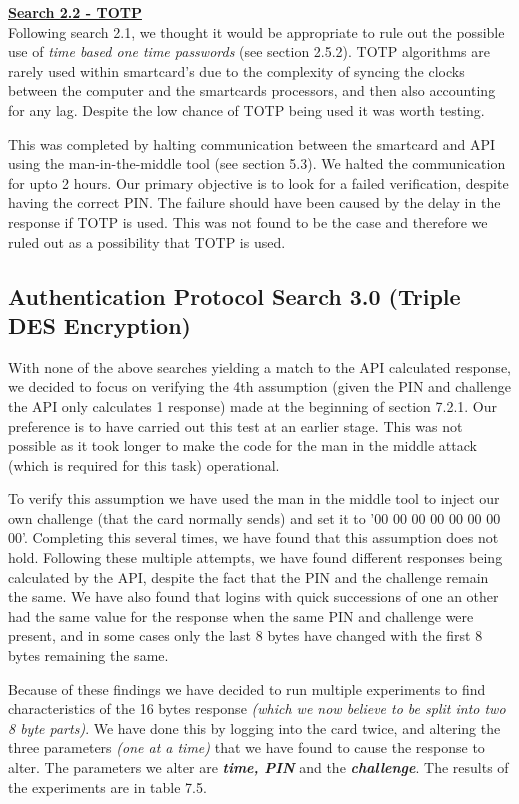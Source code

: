 \documentclass[bsc,frontabs,twoside,singlespacing,parskip,deptreport]{infthesis}     %
\begin{document}
\textbf{\underline{Search 2.2 - TOTP}}\\
Following search 2.1, we thought it would be appropriate to rule out the possible use of \textit{time based one time passwords} (see section 2.5.2). TOTP algorithms are rarely used within smartcard's due to the complexity of syncing the clocks between the computer and the smartcards processors, and then also accounting for any lag. Despite the low chance of TOTP being used it was worth testing.

This was completed by halting communication between the smartcard and API using the man-in-the-middle tool (see section 5.3). We halted the communication for upto 2 hours. Our primary objective is to look for a failed verification, despite having the correct PIN. The failure should have been caused by the delay in the response if TOTP is used. This was not found to be the case and therefore we ruled out as a possibility that TOTP is used.

\subsection{Authentication Protocol Search 3.0 (Triple DES Encryption)}

With none of the above searches yielding a match to the API calculated response, we decided to focus on verifying the 4th assumption (given the PIN and challenge the API only calculates 1 response) made at the beginning of section 7.2.1. Our preference is to have carried out this test at an earlier stage. This was not possible as it took longer to make the code for the man in the middle attack (which is required for this task) operational. 

To verify this assumption we have used the man in the middle tool to inject our own challenge (that the card normally sends) and set it to '00 00 00 00 00 00 00 00'. Completing this several times, we have found that this assumption does not hold. Following these multiple attempts, we have found different responses being calculated by the API, despite the fact that the PIN and the challenge remain the same. We have also found that logins with quick successions of one an other had the same value for the response when the same PIN and challenge were present, and in some cases only the last 8 bytes have changed with the first 8 bytes remaining the same.

Because of these findings we have decided to run multiple experiments to find characteristics of the 16 bytes response \textit{(which we now believe to be split into two 8 byte parts)}. We have done this by logging into the card twice, and altering the three parameters \textit{(one at a time)} that we have found to cause the response to alter. The parameters we alter are \textbf{\textit{time, PIN}} and the \textbf{\textit{challenge}}. The results of the experiments are in table 7.5.
\end{document}
